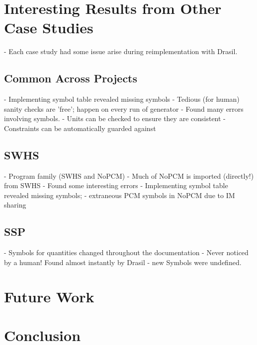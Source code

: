\documentclass{llncs}
\begin{document}
\section{Interesting Results from Other Case Studies}
 - Each case study had some issue arise during reimplementation with Drasil.
 
\subsection{Common Across Projects}
 - Implementing symbol table revealed missing symbols
 - Tedious (for human) sanity checks are 'free'; happen on every run of generator
  - Found many errors involving symbols.
  - Units can be checked to ensure they are consistent
  - Constraints can be automatically guarded against

\subsection{SWHS}
 - Program family (SWHS and NoPCM)
  - Much of NoPCM is imported (directly!) from SWHS
 - Found some interesting errors
  - Implementing symbol table revealed missing symbols;
  - extraneous PCM symbols in NoPCM due to IM sharing

\subsection{SSP}
 - Symbols for quantities changed throughout the documentation
  - Never noticed by a human! Found almost instantly by Drasil - new Symbols 
    were undefined.\nocite{*}

\section{Future Work}

\section{Conclusion}

%
%
\newpage


\end{document}
